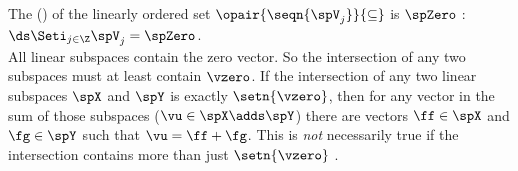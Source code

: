 The  () of the linearly ordered set $\opair{\seqn{\spV_j}}{\subseteq}$ is $\spZero$ :
  \\\indentx
    $\ds\Seti_{j\in\Z}\spV_j = \spZero$.
  \\

All linear subspaces contain the zero vector.
So the intersection of any two subspaces must at least contain $\vzero$.
If the intersection of any two linear subspaces $\spX$ and $\spY$ is exactly $\setn{\vzero}$, 
then for any vector in
the sum of those subspaces ($\vu\in\spX\adds\spY$) there are  vectors $\ff\in\spX$ and 
$\fg\in\spY$ such that $\vu=\ff+\fg$.
This is \emph{not} necessarily true if the intersection contains more than just $\setn{\vzero}$
.


